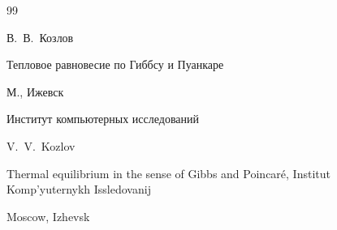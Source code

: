 \begin{thebibliography}{99}

\by В.~В.~Козлов

\book Тепловое равновесие по Гиббсу и Пуанкаре

\publaddr М., Ижевск

\publ Институт компьютерных исследований



\misctransl

\by V.~V.~Kozlov 

\book Thermal equilibrium in the sense of Gibbs and Poincar\'e, Institut Komp'yuternykh Issledovanij

\publaddr Moscow, Izhevsk







\end{thebibliography}



\noindent

\hskip6.5cm \thedate \par\noindent

\hskip6.5cm\therevdate

%






%






\clear



\makeengtitle



\newpage



%

